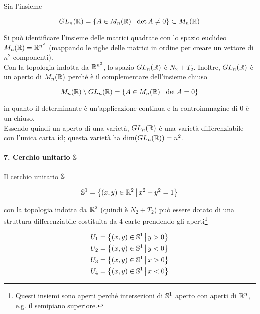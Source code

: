 Sia l'insieme

\begin{equation}
	GL_{n}(\R) = \{ A \in M_{n}(\R) \mid \det A \neq 0 \} \subset M_{n}(\R)
\end{equation}

Si può identificare l'insieme delle matrici quadrate con lo spazio euclideo $ M_{n}(\R) = \R^{n^{2}} $ (mappando le righe delle matrici in ordine per creare un vettore di $ n^{2} $ componenti).\\
Con la topologia indotta da $ \R^{n^{2}} $, lo spazio $ GL_{n}(\R) $ è $ N_{2}+T_{2} $. Inoltre, $ GL_{n}(\R) $ è un aperto di $ M_{n}(\R) $ perché è il complementare dell'insieme chiuso

\begin{equation}
	 M_{n}(\R) \setminus GL_{n}(\R) = \{ A \in M_{n}(\R) \mid \det A = 0 \}
\end{equation}

in quanto il determinante è un'applicazione continua e la controimmagine di $ 0 $ è un chiuso.\\
Essendo quindi un aperto di una varietà, $ GL_{n}(\R) $ è una varietà differenziabile con l'unica carta $ \id $; questa varietà ha $ \dim(GL_{n}(\R)) = n^{2} $.

\paragraph{7. Cerchio unitario $ \S^{1} $}\label{ex-s1}

Il cerchio unitario $ \S^{1} $

\begin{equation}
	\S^{1} = \left\{ (x,y) \in \R^{2} \, \middle| \, x^{2} + y^{2} = 1 \right\}
\end{equation}

con la topologia indotta da $ \R^{2} $ (quindi è $ N_{2}+T_{2} $) può essere dotato di una struttura differenziabile costituita da 4 carte prendendo gli aperti\footnote{%
	Questi insiemi sono aperti perché intersezioni di $ \S^{1} $ aperto con aperti di $ \R^{n} $, e.g. il semipiano superiore.}

\begin{align}
	\begin{split}
		U_{1} &= \left\{ (x,y) \in \S^{1} \, \middle| \, y>0 \right\}\\
		U_{2} &= \left\{ (x,y) \in \S^{1} \, \middle| \, y<0 \right\}\\
		U_{3} &= \left\{ (x,y) \in \S^{1} \, \middle| \, x>0 \right\}\\
		U_{4} &= \left\{ (x,y) \in \S^{1} \, \middle| \, x<0 \right\}
	\end{split}	
\end{align}

